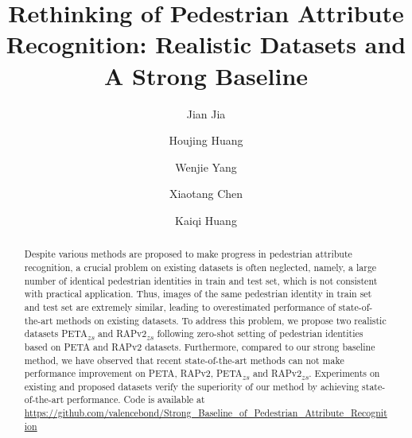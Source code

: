 \documentclass[runningheads]{llncs}
\begin{document}
\pagestyle{headings}
\mainmatter
\def\ECCVSubNumber{5996}  

\title{Rethinking of Pedestrian Attribute Recognition: Realistic Datasets and A Strong Baseline} 

\begin{comment}
\end{comment}



\author{Jian Jia \and Houjing Huang \and Wenjie Yang \and Xiaotang Chen \and Kaiqi Huang}



\maketitle


\begin{abstract}
Despite various methods are proposed to make progress in pedestrian attribute recognition, a crucial problem on existing datasets is often neglected, namely, a large number of identical pedestrian identities in train and test set, which is not consistent with practical application. Thus, images of the same pedestrian identity in train set and test set are extremely similar, leading to overestimated performance of state-of-the-art methods on existing datasets. To address this problem, we propose two realistic datasets PETA\textsubscript{$zs$} and RAPv2\textsubscript{$zs$} following zero-shot setting of pedestrian identities based on PETA and RAPv2 datasets. Furthermore, compared to our strong baseline method, we have observed that recent state-of-the-art methods can not make performance improvement on PETA, RAPv2, PETA\textsubscript{$zs$} and RAPv2\textsubscript{$zs$}. Experiments on existing and proposed datasets verify the superiority of our method by achieving state-of-the-art performance. Code is available at \url{https://github.com/valencebond/Strong_Baseline_of_Pedestrian_Attribute_Recognition}

\end{abstract}
\end{document}
